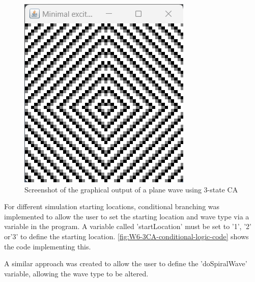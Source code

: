 \begin{figure}[H] 
    \centering
    \includegraphics[width=0.49\columnwidth]{Figures/Week 6/3stateCA-plane-output.png}
    \caption{Screenshot of the graphical output of a plane wave using 3-state CA}
    \label{fig:W6-3CA-plane-output}
\end{figure}



For different simulation starting locations, conditional branching was implemented to allow the user to set the starting location and wave type via a variable in the program. A variable called 'startLocation' must be set to '1', '2' or'3' to define the starting location. \autoref{fig:W6-3CA-conditional-logic-code} shows the code implementing this.

A similar approach was created to allow the user to define the 'doSpiralWave' variable, allowing the wave type to be altered.

